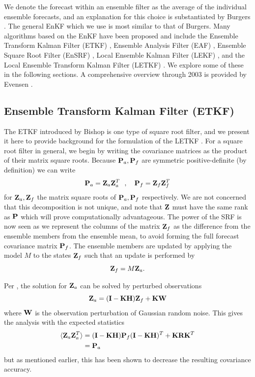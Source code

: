 We denote the forecast within an ensemble filter as the average of the individual ensemble forecasts, and an explanation for this choice is substantiated by Burgers .
The general EnKF which we use is most similar to that of Burgers.
Many algorithms based on the EnKF have been proposed and include the Ensemble Transform Kalman Filter (ETKF) , Ensemble Analysis Filter (EAF) , Ensemble Square Root Filter (EnSRF) , Local Ensemble Kalman Filter (LEKF) , and the Local Ensemble Transform Kalman Filter (LETKF) .
We explore some of these in the following sections.
A comprehensive overview through 2003 is provided by Evensen .


\subsection{Ensemble Transform Kalman Filter (ETKF)}

The ETKF introduced by Bishop is one type of square root filter, and we present it here to provide background for the formulation of the LETKF .
For a square root filter in general, we begin by writing the covariance matrices as the product of their matrix square roots.
Because $\mathbf{P}_a,\mathbf{P}_f$ are symmetric positive-definite (by definition) we can write
\begin{equation} \mathbf{P}_a = \mathbf{Z}_a \mathbf{Z}_a^T ~~,~~~ \mathbf{P}_f = \mathbf{Z}_f \mathbf{Z}_f^T \end{equation}
for $\mathbf{Z}_a,\mathbf{Z}_f$ the matrix square roots of $\mathbf{P}_a,\mathbf{P}_f$ respectively.
We are not concerned that this decomposition is not unique, and note that $\mathbf{Z}$ must have the same rank as $\mathbf{P}$ which will prove computationally advantageous.
The power of the SRF is now seen as we represent the columns of the matrix $\mathbf{Z}_f$ as the difference from the ensemble members from the ensemble mean, to avoid forming the full forecast covariance matrix $\mathbf{P}_f$.
The ensemble members are updated by applying the model $M$ to the states $\mathbf{Z}_f$ such that an update is performed by
\begin{equation} \mathbf{Z}_f = M \mathbf{Z}_a .\end{equation}

Per , the solution for $\mathbf{Z}_a$ can be solved by perturbed observations
\begin{equation} \mathbf{Z}_a = (\mathbf{I} -\mathbf{K} \mathbf{H} ) \mathbf{Z} _f + \mathbf{K} \mathbf{W} \end{equation}
where $\mathbf{W}$ is the observation perturbation of Gaussian random noise.
This gives the analysis with the expected statistics
\begin{align} \langle \mathbf{Z}_a \mathbf{Z}_a^T \rangle &= (\mathbf{I}-\mathbf{K}\mathbf{H})\mathbf{P}_f(\mathbf{I}-\mathbf{K}\mathbf{H})^T + \mathbf{K}\mathbf{R}\mathbf{K}^T\\
&=\mathbf{P}_a \end{align}
but as mentioned earlier, this has been shown to decrease the resulting covariance accuracy.

